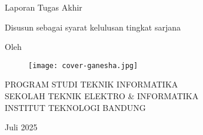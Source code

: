 \clearpage
\pagestyle{empty}

\begin{center}
    \smallskip

    \Large \bfseries \MakeUppercase{\thetitle}
    \vfill


    \Large Laporan Tugas Akhir
    \vfill

    \large Disusun sebagai syarat kelulusan tingkat sarjana
    \vfill

    \large Oleh

    \Large \theauthor

    \vfill
    \begin{figure}[htbp]
        \centering
        \texttt{[image: cover-ganesha.jpg]}
    \end{figure}
    \vfill

    \large
    \uppercase{
        Program Studi Teknik Informatika \\
        Sekolah Teknik Elektro \& Informatika \\
        Institut Teknologi Bandung
    }

    Juli 2025

\end{center}

\clearpage
